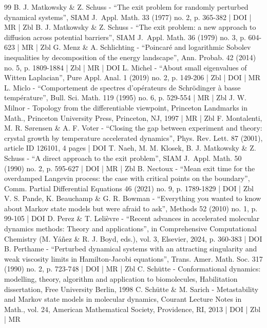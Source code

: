 \begin{thebibliography}{99}
B. J. Matkowsky \& Z. Schuss - “The exit problem for randomly perturbed dynamical systems”, SIAM J. Appl. Math. 33 (1977) no. 2, p. 365-382 | DOI | MR | Zbl
B. J. Matkowsky \& Z. Schuss - “The exit problem: a new approach to diffusion across potential barriers”, SIAM J. Appl. Math. 36 (1979) no. 3, p. 604-623 | MR | Zbl
G. Menz \& A. Schlichting - “Poincaré and logarithmic Sobolev inequalities by decomposition of the energy landscape”, Ann. Probab. 42 (2014) no. 5, p. 1809-1884 | Zbl | MR | DOI
L. Michel - “About small eigenvalues of Witten Laplacian”, Pure Appl. Anal. 1 (2019) no. 2, p. 149-206 | Zbl | DOI | MR
L. Miclo - “Comportement de spectres d’opérateurs de Schrödinger à basse température”, Bull. Sci. Math. 119 (1995) no. 6, p. 529-554 | MR | Zbl
J. W. Milnor - Topology from the differentiable viewpoint, Princeton Landmarks in Math., Princeton University Press, Princeton, NJ, 1997 | MR | Zbl
F. Montalenti, M. R. Sørensen \& A. F. Voter - “Closing the gap between experiment and theory: crystal growth by temperature accelerated dynamics”, Phys. Rev. Lett. 87 (2001), article ID 126101, 4 pages | DOI
T. Naeh, M. M. Klosek, B. J. Matkowsky \& Z. Schuss - “A direct approach to the exit problem”, SIAM J. Appl. Math. 50 (1990) no. 2, p. 595-627 | DOI | MR | Zbl
B. Nectoux - “Mean exit time for the overdamped Langevin process: the case with critical points on the boundary”, Comm. Partial Differential Equations 46 (2021) no. 9, p. 1789-1829 | DOI | Zbl
V. S. Pande, K. Beauchamp \& G. R. Bowman - “Everything you wanted to know about Markov state models but were afraid to ask”, Methods 52 (2010) no. 1, p. 99-105 | DOI
D. Perez \& T. Lelièvre - “Recent advances in accelerated molecular dynamics methods: Theory and applications”, in Comprehensive Computational Chemistry (M. Yáñez \& R. J. Boyd, eds.), vol. 3, Elsevier, 2024, p. 360-383 | DOI
B. Perthame - “Perturbed dynamical systems with an attracting singularity and weak viscosity limits in Hamilton-Jacobi equations”, Trans. Amer. Math. Soc. 317 (1990) no. 2, p. 723-748 | DOI | MR | Zbl
C. Schütte - Conformational dynamics: modelling, theory, algorithm and application to biomolecules, Habilitation dissertation, Free University Berlin, 1998
C. Schütte \& M. Sarich - Metastability and Markov state models in molecular dynamics, Courant Lecture Notes in Math., vol. 24, American Mathematical Society, Providence, RI, 2013 | DOI | Zbl | MR

\end{thebibliography}
